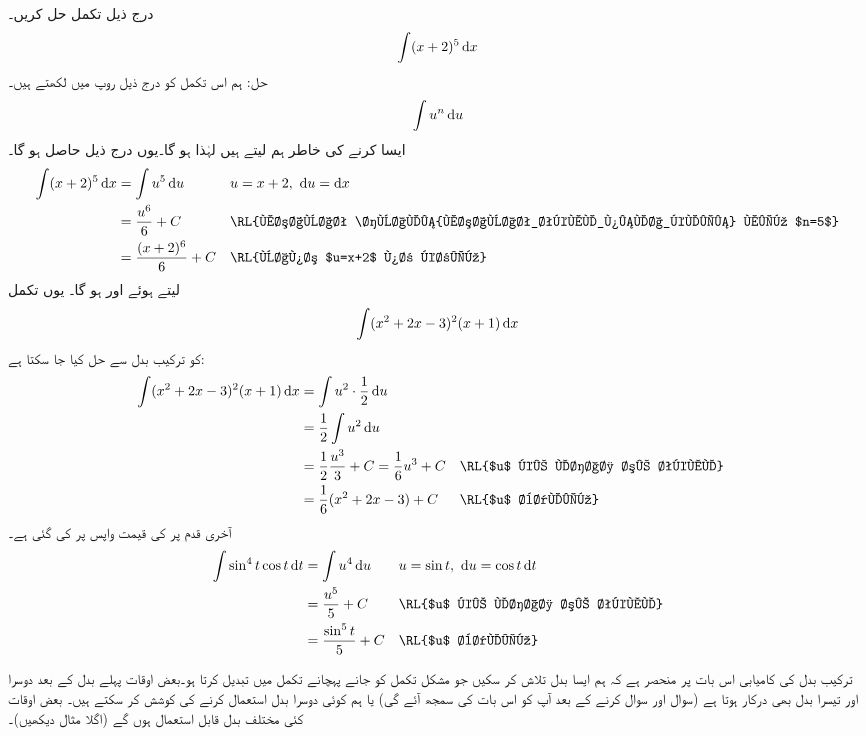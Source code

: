 درج ذیل تکمل حل کریں۔
\begin{align*}
\int(x+2)^5\dif x
\end{align*}
حل:\quad
ہم اس تکمل کو درج ذیل روپ میں لکھتے ہیں۔
\begin{align*}
\int u^n\dif u
\end{align*}
ایسا کرنے کی خاطر ہم  لیتے ہیں لہٰذا  ہو گا۔یوں درج ذیل حاصل ہو گا۔
\begin{align*}
\int (x+2)^5\dif x&=\int u^5\dif u&&u=x+2,\,\,\dif u=\dif x\\
&=\frac{u^6}{6}+C&& \text{\RL{مساوات \حوالہ{مساوات_تکمل_پہلا_کلیہ} میں $n=5$}}\\
&=\frac{(x+2)^6}{6}+C&&\text{\RL{واپس $u=x+2$ پر کریں}}
\end{align*}
 لیتے ہوئے  اور  ہو گا۔ یوں تکمل
\begin{align*}
\int (x^2+2x-3)^2(x+1)\dif x
\end{align*}
کو ترکیب بدل سے  حل کیا جا سکتا ہے:
\begin{align*}
\int (x^2+2x-3)^2(x+1)\dif x&=\int u^2\cdot \frac{1}{2}\dif u\\
&=\frac{1}{2}\int u^2\dif u\\
&=\frac{1}{2}\frac{u^3}{3}+C=\frac{1}{6}u^3+C&&\text{\RL{$u$ کے لحاظ سے تکمل}}\\
&=\frac{1}{6}(x^2+2x-3)+C&&\text{\RL{$u$ بدلیں}}
\end{align*}
آخری قدم پر  کی قیمت واپس پر کی گئی ہے۔
\begin{align*}
\int\sin^4t\cos t\dif t&=\int u^4\dif u&&u=\sin t,\,\, \dif u=\cos t\dif t\\
&=\frac{u^5}{5}+C&&\text{\RL{$u$ کے لحاظ سے تکمل}}\\
&=\frac{\sin^5t}{5}+C&&\text{\RL{$u$ بدلیں}}
\end{align*}

ترکیب بدل کی کامیابی اس بات پر منحصر ہے کہ ہم ایسا بدل تلاش کر سکیں جو مشکل تکمل کو جانے پہچانے تکمل میں تبدیل کرتا ہو۔بعض اوقات پہلے بدل کے بعد دوسرا اور تیسرا بدل بھی درکار ہوتا ہے (سوال  اور سوال  کرنے کے بعد آپ کو اس بات کی سمجھ آئے گی) یا ہم کوئی دوسرا بدل استعمال کرنے کی کوشش کر سکتے ہیں۔ بعض اوقات کئی مختلف بدل قابل استعمال ہوں گے (اگلا مثال دیکھیں)۔

